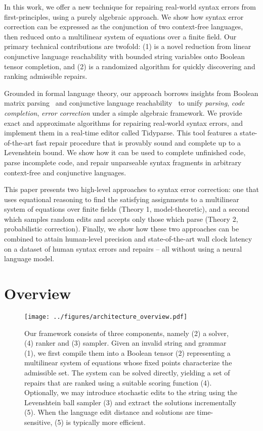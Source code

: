 \documentclass[sigplan,review,anonymous,acmsmall]{acmart}\settopmatter{printfolios=false,printccs=false,printacmref=false}
\begin{document}
In this work, we offer a new technique for repairing real-world syntax errors from first-principles, using a purely algebraic approach. We show how syntax error correction can be expressed as the conjunction of two context-free languages, then reduced onto a multilinear system of equations over a finite field. Our primary technical contributions are twofold: (1) is a novel reduction from linear conjunctive language reachability with bounded string variables onto Boolean tensor completion, and (2) is a randomized algorithm for quickly discovering and ranking admissible repairs.

Grounded in formal language theory, our approach borrows insights from Boolean matrix parsing~\cite{valiant1975general} and conjunctive language reachability~\cite{zhang2017context} to unify \textit{parsing}, \textit{code completion}, \textit{error correction} under a simple algebraic framework. We provide exact and approximate algorithms for repairing real-world syntax errors, and implement them in a real-time editor called Tidyparse. This tool features a state-of-the-art fast repair procedure that is provably sound and complete up to a Levenshtein bound. We show how it can be used to complete unfinished code, parse incomplete code, and repair unparseable syntax fragments in arbitrary context-free and conjunctive languages.

This paper presents two high-level approaches to syntax error correction: one that uses equational reasoning to find the satisfying assignments to a multilinear system of equations over finite fields (Theory 1, model-theoretic), and a second which samples random edits and accepts only those which parse (Theory 2, probabilistic correction). Finally, we show how these two approaches can be combined to attain human-level precision and state-of-the-art wall clock latency on a dataset of human syntax errors and repairs -- all without using a neural language model.

\section{Overview}

\begin{figure}
  \centering
  \texttt{[image: ../figures/architecture\_overview.pdf]}
  \caption{Our framework consists of three components, namely (2) a solver, (4) ranker and (3) sampler. Given an invalid string and grammar (1), we first compile them into a Boolean tensor (2) representing a multilinear system of equations whose fixed points characterize the admissible set. The system can be solved directly, yielding a set of repairs that are ranked using a suitable scoring function (4). Optionally, we may introduce stochastic edits to the string using the Levenshtein ball sampler (3) and extract the solutions incrementally (5). When the language edit distance and solutions are time-sensitive, (5) is typically more efficient.}
  \label{fig:overview}
\end{figure}
\end{document}
